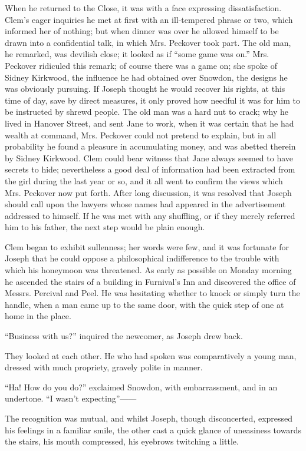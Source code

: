 When he returned to the Close, it was with a face expressing
dissatisfaction. Clem's eager inquiries he met at first with an
ill-tempered phrase or two, which informed her of nothing; but when
dinner was over he allowed himself to be drawn into a confidential talk,
in which Mrs. Peckover took part. The old man, he remarked, was devilish
{}close; it looked as if ``some game was on.'' Mrs. Peckover ridiculed
this remark; of course there was a game on; she spoke of Sidney
Kirkwood, the influence he had obtained over Snowdon, the designs he was
obviously pursuing. If Joseph thought he would recover his rights, at
this time of day, save by direct measures, it only proved how needful it
was for him to be instructed by shrewd people. The old man was a hard
nut to crack; why he lived in Hanover Street, and sent Jane to work,
when it was certain that he had wealth at command, Mrs. Peckover could
not pretend to explain, but in all probability he found a pleasure in
accumulating money, and was abetted therein by Sidney Kirkwood. Clem
could bear witness that Jane always seemed to have secrets to hide;
nevertheless a good deal of information had been extracted from the girl
during the last year or so, and it all went to confirm the views which
Mrs. Peckover now put forth. After long discussion, it was resolved that
Joseph should call upon the lawyers whose {}names had appeared in the
advertisement addressed to himself. If he was met with any shuffling, or
if they merely referred him to his father, the next step would be plain
enough.

Clem began to exhibit sullenness; her words were few, and it was
fortunate for Joseph that he could oppose a philosophical indifference
to the trouble with which his honeymoon was threatened. As early as
possible on Monday morning he ascended the stairs of a building in
Furnival's Inn and discovered the office of Messrs. Percival and Peel.
He was hesitating whether to knock or simply turn the handle, when a man
came up to the same door, with the quick step of one at home in the
place.

``Business with us?'' inquired the newcomer, as Joseph drew back.

They looked at each other. He who had spoken was comparatively a young
man, dressed with much propriety, gravely polite in manner.

``Ha! How do you do?'' exclaimed {}Snowdon, with embarrassment, and in
an undertone. ``I wasn't expecting''{{------}}

The recognition was mutual, and whilst Joseph, though disconcerted,
expressed his feelings in a familiar smile, the other cast a quick
glance of uneasiness towards the stairs, his mouth compressed, his
eyebrows twitching a little.

